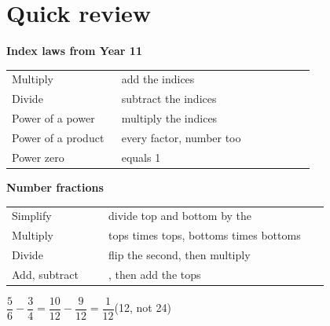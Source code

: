 \documentclass[11pt]{article}
\begin{document}
\section{Quick review}\label{h:review}
\renewcommand\arraystretch{1.45}
\begin{minipage}[t]{0.47\textwidth}\vspace{0pt}
\textbf{Index laws from Year 11}\par\smallskip
\begin{tabular}{@{}>{\raggedright}p{0.34\linewidth} >{\raggedright\arraybackslash}p{0.6\linewidth}@{}}
\toprule
Multiply & add the indices \\
Divide & subtract the indices \\
Power of a power & multiply the indices \\
Power of a product & every factor, number too \\
Power zero & equals 1 \\
\bottomrule
\end{tabular}
\end{minipage}\hfill
\begin{minipage}[t]{0.47\textwidth}\vspace{0pt}
\textbf{Number fractions}\par\smallskip
\begin{tabular}{@{}>{\raggedright}p{0.28\linewidth} >{\raggedright\arraybackslash}p{0.64\linewidth}@{}}
\toprule
Simplify & divide top and bottom by the \Thcf{} \\
Multiply & tops times tops, bottoms times bottoms \\
Divide & flip the second, then multiply \\
Add, subtract & \Tlcd{}, then add the tops \\
\bottomrule
\end{tabular}\par\smallskip
$\dfrac{5}{6}-\dfrac{3}{4} = \dfrac{10}{12}-\dfrac{9}{12} = \dfrac{1}{12}$\quad (12, not 24)
\end{minipage}
\end{document}
